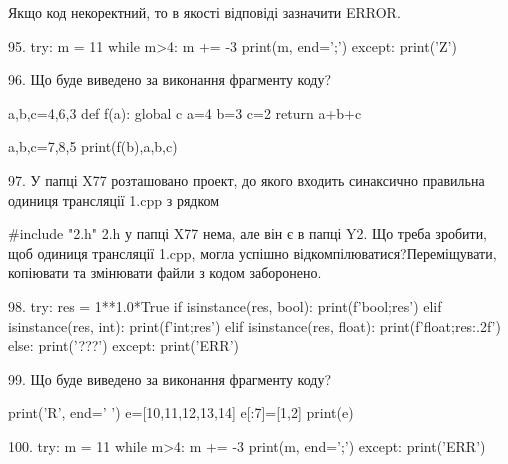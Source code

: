 \documentclass[11pt]{article}
\begin{document}
{{Якщо код некоректний, то в якості відповіді зазначити ERROR.



95. 
try:
    m = 11
    while m>4:
        m += -3
    print(m, end=';')
except:
    print('Z')

96. Що буде виведено за виконання фрагменту коду?

a,b,c=4,6,3
def f(a):
global c    a=4
    b=3
    c=2
    return a+b+c

a,b,c=7,8,5
print(f(b),a,b,c)

97. 
У папці X77 розташовано проект, до якого входить синаксично правильна одиниця трансляції 1.cpp з рядком\par
{\#}include "2.h"
 2.h у папці X77 нема, але він є в папці Y2. Що треба зробити, щоб одиниця трансляції 1.cpp, могла успішно відкомпілюватися?Переміщувати, копіювати та змінювати файли з кодом заборонено.\par\vspace{1.5cm}
98. 
try:
    res = 1**1.0*True
    if isinstance(res, bool):
        print(f'bool;{res}')
    elif isinstance(res, int):
        print(f'int;{res}')
    elif isinstance(res, float):
        print(f'float;{res:.2f}')
    else:
        print('???')
except:
    print('ERR')

99. Що буде виведено за виконання фрагменту коду?

print('R', end=' ')
e=[10,11,12,13,14]
e[:7]=[1,2]
print(e)


100. 
try:
    m = 11
    while m>4:
        m += -3
    print(m, end=';')
except:
    print('ERR')

}}
\end{document}
